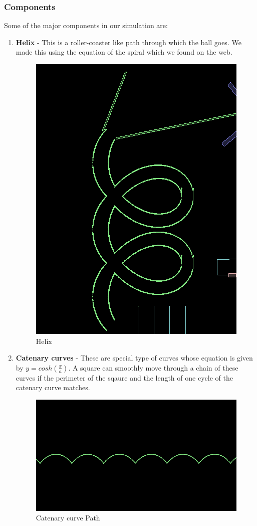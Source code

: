 \documentclass[12pt, a4paper]{article}
\begin{document}
\subsubsection{Components}
Some of the major components in our simulation are:
\begin{enumerate}
\item \textbf{Helix} - This is a roller-coaster like path through which the ball goes. We made this using the equation of the spiral which we found on the web. 
\begin{figure}[H]
\caption{Helix}
\centering
\includegraphics[scale=0.20]{helix.png}
\end{figure}
\item \textbf{Catenary curves} - These are special type of curves whose equation is given by $y= cosh(\frac{x}{a})$. A square can smoothly move through a chain of these curves if the perimeter of the sqaure and the length of one cycle of the catenary curve matches.
\begin{figure}[H]
\caption{Catenary curve Path}
\centering
\includegraphics[scale=0.20]{catenary2.png}

\end{figure}
\end{enumerate}
\end{document}
